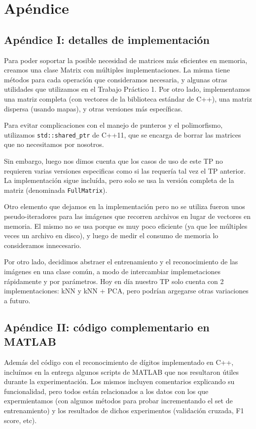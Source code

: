 \section{Apéndice}

\subsection{Apéndice I: detalles de implementación}

Para poder soportar la posible necesidad de matrices más eficientes en memoria, creamos una clase Matrix con múltiples implementaciones. La misma tiene métodos para cada operación que consideramos necesaria, y algunas otras utilidades que utilizamos en el Trabajo Práctico 1. Por otro lado, implementamos una matriz completa (con vectores de la biblioteca estándar de C++), una matriz dispersa (usando mapas), y otras versiones más específicas.

Para evitar complicaciones con el manejo de punteros y el polimorfismo, utilizamos \texttt{std::shared\_ptr} de C++11, que se encarga de borrar las matrices que no necesitamos por nosotros.

Sin embargo, luego nos dimos cuenta que los casos de uso de este TP no requieren varias versiones especificas como si las requería tal vez el TP anterior. La implementación sigue incluída, pero solo se usa la versión completa de la matriz (denominada \texttt{FullMatrix}).

Otro elemento que dejamos en la implementación pero no se utiliza fueron unos pseudo-iteradores para las imágenes que recorren archivos en lugar de vectores en memoria. El mismo no se usa porque es muy poco eficiente (ya que lee múltiples veces un archivo en disco), y luego de medir el consumo de memoria lo consideramos innecesario.

Por otro lado, decidimos abstraer el entrenamiento y el reconocimiento de las imágenes en una clase común, a modo de intercambiar implemetaciones rápidamente y por parámetros. Hoy en día nuestro TP solo cuenta con 2 implementaciones: kNN y kNN + PCA, pero podrían argegarse otras variaciones a futuro.

\subsection{Apéndice II: código complementario en MATLAB}

Además del código con el reconocimiento de dígitos implementado en C++, incluímos en la entrega algunos scripts de MATLAB que nos resultaron útiles durante la experimentación. Los mismos incluyen comentarios explicando su funcionalidad, pero todos están relacionados a los datos con los que expermientamos (con algunos métodos para probar incrementando el set de entrenamiento) y los resultados de dichos experimentos (validación cruzada, F1 score, etc).

